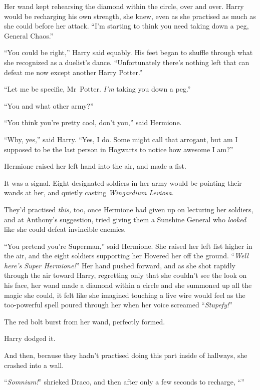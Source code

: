 Her wand kept rehearsing the diamond within the circle, over and over. Harry would be recharging his own strength, she knew, even as she practised as much as she could before her attack. “I’m starting to think you need taking down a peg, General Chaos.”

“You could be right,” Harry said equably. His feet began to shuffle through what she recognized as a duelist’s dance. “Unfortunately there’s nothing left that can defeat me now except another Harry Potter.”

“Let me be specific, Mr~Potter. \emph{I’m} taking you down a peg.”

“You and what other army?”

“You think you’re pretty cool, don’t you,” said Hermione.

“Why, yes,” said Harry. “Yes, I do. Some might call that arrogant, but am I supposed to be the last person in Hogwarts to notice how awesome I am?”

Hermione raised her left hand into the air, and made a fist.

It was a signal. Eight designated soldiers in her army would be pointing their wands at her, and quietly casting \emph{Wingardium Leviosa}.

They’d practised \emph{this,} too, once Hermione had given up on lecturing her soldiers, and at Anthony’s suggestion, tried giving them a Sunshine General who \emph{looked} like she could defeat invincible enemies.

“You pretend you’re Superman,” said Hermione. She raised her left fist higher in the air, and the eight soldiers supporting her Hovered her off the ground. “\emph{Well here’s Super Hermione!}” Her hand pushed forward, and as she shot rapidly through the air toward Harry, regretting only that she couldn’t see the look on his face, her wand made a diamond within a circle and she summoned up all the magic she could, it felt like she imagined touching a live wire would feel as the too-powerful spell poured through her when her voice screamed “\emph{Stupefy!}”

The red bolt burst from her wand, perfectly formed.

Harry dodged it.

And then, because they hadn’t practised doing this part inside of hallways, she crashed into a wall.

\later

“\emph{Somnium!}” shrieked Draco, and then after only a few seconds to recharge, “”

